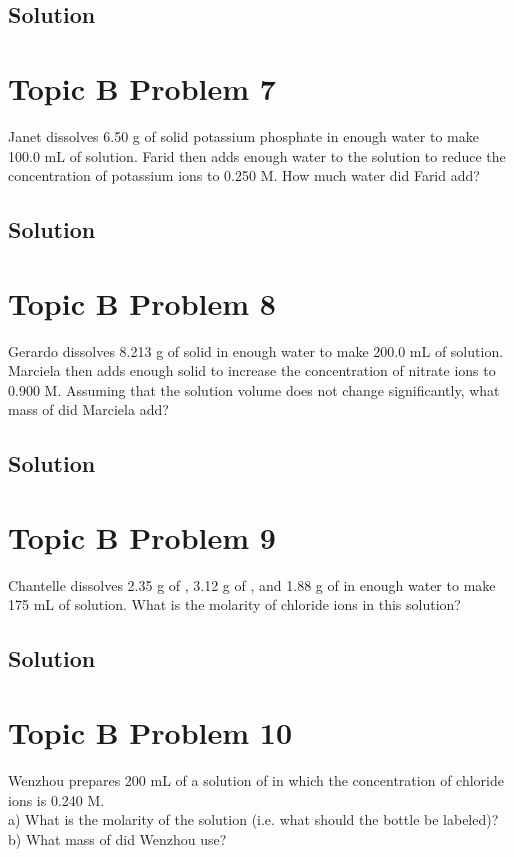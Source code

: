 \documentclass[10pt]{article}
\begin{document}
        \subsection{Solution}

    \pagebreak
    \section{Topic B Problem 7}
        Janet dissolves 6.50 g of solid potassium phosphate in enough water to make 100.0 mL of solution. 
        Farid then adds enough water to the solution to reduce the concentration of potassium ions to 0.250 M. 
        How much water did Farid add?

        \subsection{Solution}

    \pagebreak
    \section{Topic B Problem 8}
        Gerardo dissolves 8.213 g of solid  in enough water to make 200.0 mL of solution.
        Marciela then adds enough solid  to increase the concentration of nitrate ions to 0.900 M. 
        Assuming that the solution volume does not change significantly, what mass of  did Marciela add?

        \subsection{Solution}

    \pagebreak
    \section{Topic B Problem 9}
        Chantelle dissolves 2.35 g of , 3.12 g of , and 1.88 g of  in enough water to make 175 mL of solution. 
        What is the molarity of chloride ions in this solution?

        \subsection{Solution}

    \pagebreak
    \section{Topic B Problem 10}
        Wenzhou prepares 200 mL of a solution of  in which the concentration of chloride ions is 0.240 M.\\
        a) What is the molarity of the  solution (i.e. what should the bottle be labeled)?\\
        b) What mass of  did Wenzhou use?
\end{document}
